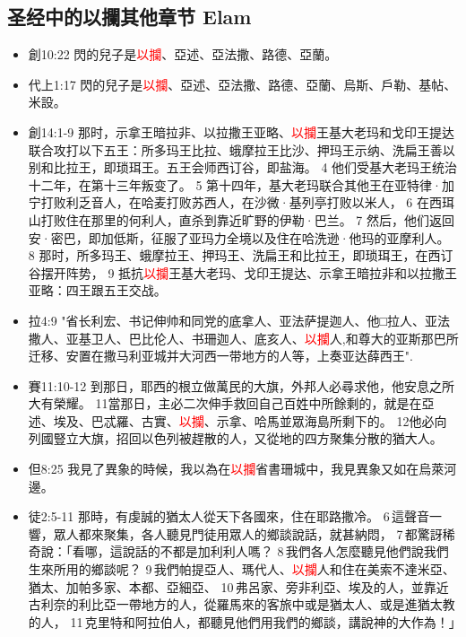 \subsection{圣经中的以攔其他章节 Elam}
\begin{itemize}
\item 創10:22 閃的兒子是\textcolor{red}{以攔}、亞述、亞法撒、路德、亞蘭。
\item 代上1:17 閃的兒子是\textcolor{red}{以攔}、亞述、亞法撒、路德、亞蘭、烏斯、戶勒、基帖、米設。
\item 創14:1-9 那时，示拿王暗拉非、以拉撒王亚略、\textcolor{red}{以攔}王基大老玛和戈印王提达联合攻打以下五王：所多玛王比拉、蛾摩拉王比沙、押玛王示纳、洗扁王善以别和比拉王，即琐珥王。五王会师西订谷，即盐海。 4 他们受基大老玛王统治十二年，在第十三年叛变了。 5 第十四年，基大老玛联合其他王在亚特律·加宁打败利乏音人，在哈麦打败苏西人，在沙微·基列亭打败以米人， 6 在西珥山打败住在那里的何利人，直杀到靠近旷野的伊勒·巴兰。 7 然后，他们返回安·密巴，即加低斯，征服了亚玛力全境以及住在哈洗逊·他玛的亚摩利人。 8 那时，所多玛王、蛾摩拉王、押玛王、洗扁王和比拉王，即琐珥王，在西订谷摆开阵势， 9 抵抗\textcolor{red}{以攔}王基大老玛、戈印王提达、示拿王暗拉非和以拉撒王亚略：四王跟五王交战。
\item 拉4:9 "省长利宏、书记伸帅和同党的底拿人、亚法萨提迦人、他□拉人、亚法撒人、亚基卫人、巴比伦人、书珊迦人、底亥人、\textcolor{red}{以攔}人,和尊大的亚斯那巴所迁移、安置在撒马利亚城并大河西一带地方的人等，上奏亚达薛西王".
\item 賽11:10-12 到那日，耶西的根立做萬民的大旗，外邦人必尋求他，他安息之所大有榮耀。 11當那日，主必二次伸手救回自己百姓中所餘剩的，就是在亞述、埃及、巴忒羅、古實、\textcolor{red}{以攔}、示拿、哈馬並眾海島所剩下的。 12他必向列國豎立大旗，招回以色列被趕散的人，又從地的四方聚集分散的猶大人。
\item 但8:25 我見了異象的時候，我以為在\textcolor{red}{以攔}省書珊城中，我見異象又如在烏萊河邊。
\item 徒2:5-11 那時，有虔誠的猶太人從天下各國來，住在耶路撒冷。 6 這聲音一響，眾人都來聚集，各人聽見門徒用眾人的鄉談說話，就甚納悶， 7 都驚訝稀奇說：「看哪，這說話的不都是加利利人嗎？ 8 我們各人怎麼聽見他們說我們生來所用的鄉談呢？ 9 我們帕提亞人、瑪代人、\textcolor{red}{以攔}人和住在美索不達米亞、猶太、加帕多家、本都、亞細亞、 10 弗呂家、旁非利亞、埃及的人，並靠近古利奈的利比亞一帶地方的人，從羅馬來的客旅中或是猶太人、或是進猶太教的人， 11 克里特和阿拉伯人，都聽見他們用我們的鄉談，講說神的大作為！」
\end{itemize}










